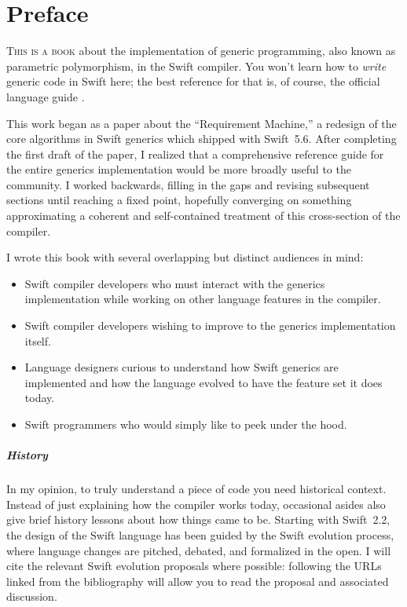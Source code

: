 \documentclass[../generics]{subfiles}
\begin{document}
\chapter*{Preface}


\lettrine{T}{his is a book} about the implementation of generic programming, also known as parametric polymorphism, in the Swift compiler. You won't learn how to \emph{write} generic code in Swift here; the best reference for that is, of course, the official language guide \cite{tspl}.

This work began as a paper about the ``Requirement Machine,'' a redesign of the core algorithms in Swift generics which shipped with Swift~5.6. After completing the first draft of the paper, I realized that a comprehensive reference guide for the entire generics implementation would be more broadly useful to the community. I worked backwards, filling in the gaps and revising subsequent sections until reaching a fixed point, hopefully converging on something approximating a coherent and self-contained treatment of this cross-section of the compiler.

I wrote this book with several overlapping but distinct audiences in mind:
\begin{itemize}
\item Swift compiler developers who must interact with the generics implementation while working on other language features in the compiler.
\item Swift compiler developers wishing to improve to the generics implementation itself.
\item Language designers curious to understand how Swift generics are implemented and how the language evolved to have the feature set it does today.
\item Swift programmers who would simply like to peek under the hood.
\end{itemize}


\paragraph{History} In my opinion, to truly understand a piece of code you need historical context. Instead of just explaining how the compiler works today, occasional asides also give brief history lessons about how things came to be. Starting with Swift~2.2, the design of the Swift language has been guided by the Swift evolution process, where language changes are pitched, debated, and formalized in the open. I will cite the relevant Swift evolution proposals where possible: following the URLs linked from the bibliography will allow you to read the proposal and associated discussion.
\end{document}
